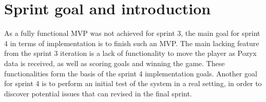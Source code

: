 \section{Sprint goal and introduction}
As a fully functional MVP was not achieved for sprint 3, the main goal for sprint 4 in terms of implementation is to finish such an MVP.
The main lacking feature from the sprint 3 iteration is a lack of functionality to move the player as Pozyx data is received, as well as scoring goals and winning the game.
These functionalities form the basis of the sprint 4 implementation goals.
Another goal for sprint 4 is to perform an initial test of the system in a real setting, in order to discover potential issues that can revised in the final sprint.  